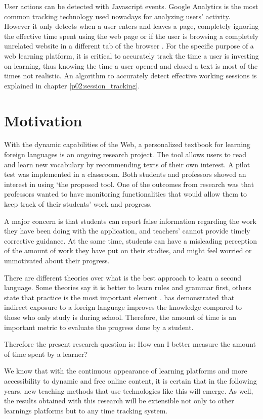 User actions can be detected with Javascript events. Google Analytics is the most common tracking technology used nowadays for analyzing users' activity. However it only detects when a user enters and leaves a page, completely ignoring the effective time spent using the web page or if the user is browsing a completely unrelated website in a different tab of the browser \cite{GoogleAnalytics01} \cite{MisunderstoodMetrics}. For the specific purpose of a web learning platform, it is critical to accurately track the time a user is investing on learning, thus knowing the time a user opened and closed a text is most of the times not realistic. An algorithm to accurately detect effective working sessions is explained in chapter \ref{p02:session_tracking}.

\section{Motivation}
With the dynamic capabilities of the Web, a personalized textbook for learning foreign languages \cite{Mircea2018} is an ongoing research project. The tool allows users to read and learn new vocabulary by recommending texts of their own interest. A pilot test was implemented in a classroom. Both students and professors showed an interest in using `the proposed tool. One of the outcomes from \citeauthor{Mircea2018} research was that professors wanted to have monitoring functionalities that would allow them to keep track of their students' work and progress.

A major concern is that students can report false information regarding the work they have been doing with the application, and teachers' cannot provide timely corrective guidance. At the same time, students can have a misleading perception of the amount of work they have put on their studies, and might feel worried or unmotivated about their progress.

There are different theories over what is the best approach to learn a second language. Some theories say it is better to learn rules and grammar first, others state that practice is the most important element \cite{Ellis1993}. \citeauthor{Kuppens2010} has demonstrated that indirect exposure to a foreign language improves the knowledge compared to those who only study is during school. Therefore, the amount of time is an important metric to evaluate the progress done by a student.

Therefore the present research question is:
How can I better measure the amount of time spent by a learner?


We know that with the continuous appearance of learning platforms and more accessibility to dynamic and free online content, it is certain that in the following years, new teaching methods that use technologies like this will emerge. As well, the results obtained with this research will be extensible not only to other learnings platforms but to any time tracking system.





